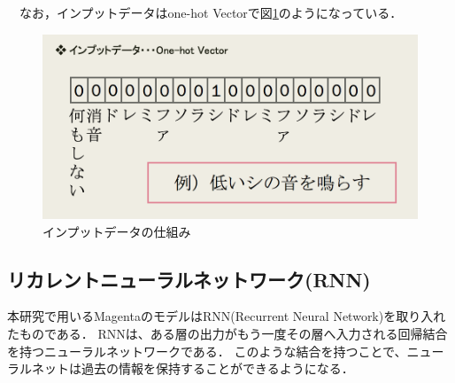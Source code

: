 　なお，インプットデータはone-hot Vectorで図\ref{fig:インプットデータの仕組み}のようになっている．
\begin{figure}[h]
    \begin{screen}
    \begin{center}
        \includegraphics[scale=0.85,clip]{./img/midi1.png}
        \caption{インプットデータの仕組み}
        \label{fig:インプットデータの仕組み}
    \end{center}
    \end{screen}
\end{figure}
\subsection{リカレントニューラルネットワーク(RNN)}
本研究で用いるMagentaのモデルはRNN(Recurrent Neural Network)を取り入れたものである．
RNNは、ある層の出力がもう一度その層へ入力される回帰結合を持つニューラルネットワークである．
このような結合を持つことで、ニューラルネットは過去の情報を保持することができるようになる．
\newpage
